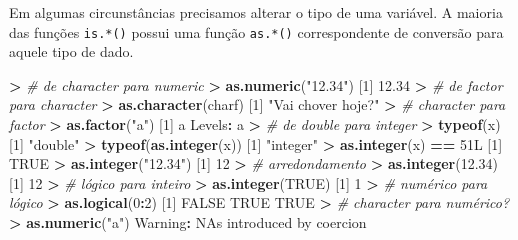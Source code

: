 \documentclass[]{book}
\newenvironment{Shaded}{\begin{snugshade}}{\end{snugshade}}
\newcommand{\KeywordTok}[1]{\textcolor[rgb]{0.13,0.29,0.53}{\textbf{#1}}}
\newcommand{\DecValTok}[1]{\textcolor[rgb]{0.00,0.00,0.81}{#1}}
\newcommand{\FloatTok}[1]{\textcolor[rgb]{0.00,0.00,0.81}{#1}}
\newcommand{\StringTok}[1]{\textcolor[rgb]{0.31,0.60,0.02}{#1}}
\newcommand{\CommentTok}[1]{\textcolor[rgb]{0.56,0.35,0.01}{\textit{#1}}}
\newcommand{\OtherTok}[1]{\textcolor[rgb]{0.56,0.35,0.01}{#1}}
\newcommand{\OperatorTok}[1]{\textcolor[rgb]{0.81,0.36,0.00}{\textbf{#1}}}
\newcommand{\ErrorTok}[1]{\textcolor[rgb]{0.64,0.00,0.00}{\textbf{#1}}}
\newcommand{\NormalTok}[1]{#1}
\begin{document}
Em algumas circunstâncias precisamos alterar o tipo de uma variável. A
maioria das funções \texttt{is.*()} possui uma função \texttt{as.*()}
correspondente de conversão para aquele tipo de dado.

\begin{Shaded}
\begin{Highlighting}[]
\OperatorTok{>}\StringTok{ }\CommentTok{# de character para numeric}
\ErrorTok{>}\StringTok{ }\KeywordTok{as.numeric}\NormalTok{(}\StringTok{"12.34"}\NormalTok{) }
\NormalTok{[}\DecValTok{1}\NormalTok{] }\FloatTok{12.34}
\OperatorTok{>}\StringTok{ }\CommentTok{# de factor para character}
\ErrorTok{>}\StringTok{ }\KeywordTok{as.character}\NormalTok{(charf)}
\NormalTok{[}\DecValTok{1}\NormalTok{] }\StringTok{"Vai chover hoje?"}
\OperatorTok{>}\StringTok{ }\CommentTok{# character para factor}
\ErrorTok{>}\StringTok{ }\KeywordTok{as.factor}\NormalTok{(}\StringTok{"a"}\NormalTok{)}
\NormalTok{[}\DecValTok{1}\NormalTok{] a}
\NormalTok{Levels}\OperatorTok{:}\StringTok{ }\NormalTok{a}
\OperatorTok{>}\StringTok{ }\CommentTok{# de double para integer}
\ErrorTok{>}\StringTok{ }\KeywordTok{typeof}\NormalTok{(x)}
\NormalTok{[}\DecValTok{1}\NormalTok{] }\StringTok{"double"}
\OperatorTok{>}\StringTok{ }\KeywordTok{typeof}\NormalTok{(}\KeywordTok{as.integer}\NormalTok{(x))}
\NormalTok{[}\DecValTok{1}\NormalTok{] }\StringTok{"integer"}
\OperatorTok{>}\StringTok{ }\KeywordTok{as.integer}\NormalTok{(x) }\OperatorTok{==}\StringTok{ }\NormalTok{51L}
\NormalTok{[}\DecValTok{1}\NormalTok{] }\OtherTok{TRUE}
\OperatorTok{>}\StringTok{ }\KeywordTok{as.integer}\NormalTok{(}\StringTok{"12.34"}\NormalTok{)}
\NormalTok{[}\DecValTok{1}\NormalTok{] }\DecValTok{12}
\OperatorTok{>}\StringTok{ }\CommentTok{# arredondamento}
\ErrorTok{>}\StringTok{ }\KeywordTok{as.integer}\NormalTok{(}\FloatTok{12.34}\NormalTok{)}
\NormalTok{[}\DecValTok{1}\NormalTok{] }\DecValTok{12}
\OperatorTok{>}\StringTok{ }\CommentTok{# lógico para inteiro}
\ErrorTok{>}\StringTok{ }\KeywordTok{as.integer}\NormalTok{(}\OtherTok{TRUE}\NormalTok{)}
\NormalTok{[}\DecValTok{1}\NormalTok{] }\DecValTok{1}
\OperatorTok{>}\StringTok{ }\CommentTok{# numérico para lógico}
\ErrorTok{>}\StringTok{ }\KeywordTok{as.logical}\NormalTok{(}\DecValTok{0}\OperatorTok{:}\DecValTok{2}\NormalTok{)}
\NormalTok{[}\DecValTok{1}\NormalTok{] }\OtherTok{FALSE}  \OtherTok{TRUE}  \OtherTok{TRUE}
\OperatorTok{>}\StringTok{ }\CommentTok{# character para numérico?}
\ErrorTok{>}\StringTok{ }\KeywordTok{as.numeric}\NormalTok{(}\StringTok{"a"}\NormalTok{)}
\NormalTok{Warning}\OperatorTok{:}\StringTok{ }\NormalTok{NAs introduced by coercion}

\end{Highlighting}
\end{Shaded}
\end{document}

